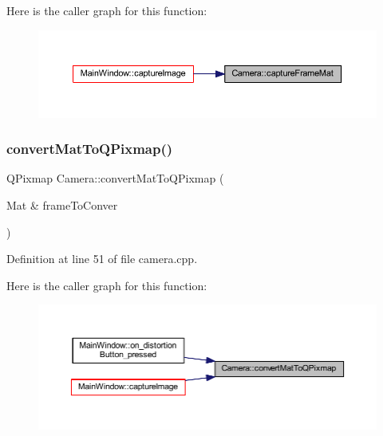 Here is the caller graph for this function\+:
\nopagebreak
\begin{figure}[H]
\begin{center}
\leavevmode
\includegraphics[width=350pt]{classCamera_abfa965e4380023e2295edd9a13f4ee63_icgraph}
\end{center}
\end{figure}
\mbox{\label{classCamera_a4d72f8dcccdb1c6bc8a4c1f36ab1553a}} 
\subsubsection{\texorpdfstring{convertMatToQPixmap()}{convertMatToQPixmap()}}
{\footnotesize\ttfamily Q\+Pixmap Camera\+::convert\+Mat\+To\+Q\+Pixmap (\begin{DoxyParamCaption}\item[{Mat \&}]{frame\+To\+Conver }\end{DoxyParamCaption})}



Definition at line 51 of file camera.\+cpp.

Here is the caller graph for this function\+:
\nopagebreak
\begin{figure}[H]
\begin{center}
\leavevmode
\includegraphics[width=350pt]{classCamera_a4d72f8dcccdb1c6bc8a4c1f36ab1553a_icgraph}
\end{center}
\end{figure}
\mbox{\label{classCamera_a4702bbf7ccf85a5a2dd61fbf6abb7237}} 
